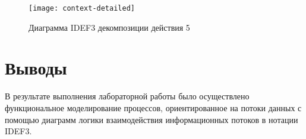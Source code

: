 \documentclass[a4paper,14pt]{extarticle}
\begin{document}
\begin{figure}[H]
    \centering
    \texttt{[image: context-detailed]}
    \caption{Диаграмма IDEF3 декомпозиции действия 5}
    \label{fig:exercise-receival-process}
\end{figure}

\section*{Выводы}
В результате выполнения лабораторной работы было осуществлено функциональное
моделирование процессов, ориентированное на потоки данных с помощью диаграмм
логики взаимодействия информационных потоков в нотации IDEF3.
\end{document}
